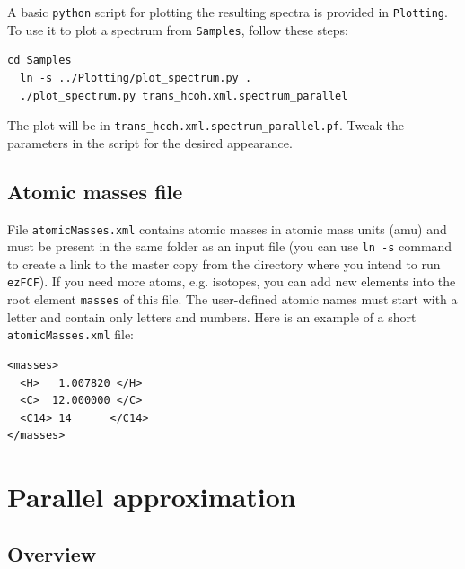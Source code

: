\documentclass[11pt]{article}
\begin{document}
A basic {\tt python} script for plotting the resulting spectra is provided in {\tt Plotting}. To use it to plot a spectrum  from {\tt Samples}, follow these steps:
\begin{lstlisting}[frame=single,framerule=0pt]
  cd Samples
  ln -s ../Plotting/plot_spectrum.py .
  ./plot_spectrum.py trans_hcoh.xml.spectrum_parallel
\end{lstlisting}
The plot will be in {\tt trans\_hcoh.xml.spectrum\_parallel.pf}. Tweak the parameters in the script for the desired appearance. 


\subsection{Atomic masses file}
\label{sec:masses}

File {\tt atomicMasses.xml} contains atomic masses in atomic mass units (amu) and must be present in the same folder 
as an \xml input file (you can use {\tt ln -s} command to create a link to the master copy from the directory
where you intend to run {\tt ezFCF}). 
If you need more atoms, e.g. isotopes, you can add new
elements into the root element {\tt masses} of this file. 
The user-defined atomic names must start with a letter and contain only letters and numbers.
Here is an example of a short {\tt atomicMasses.xml} file:
\begin{lstlisting}[frame=single,framerule=0pt]
<masses>
  <H>   1.007820 </H>
  <C>  12.000000 </C>
  <C14> 14      </C14>
</masses>
\end{lstlisting}

\section{Parallel approximation}
\label{sec:parallel}

\subsection{Overview}
\label{sec:para:overview}
\end{document}
